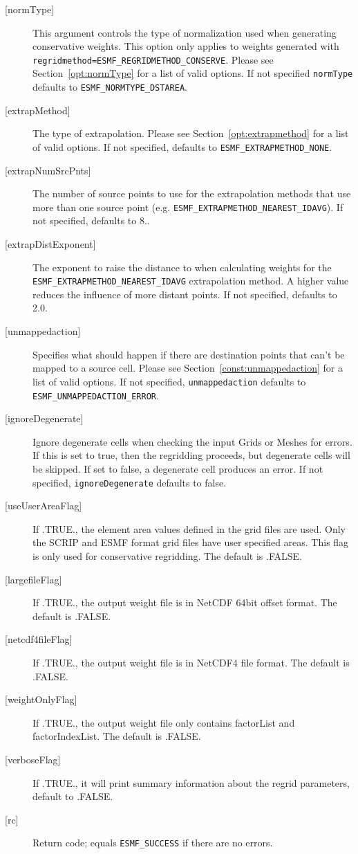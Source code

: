 \begin{description}
       \item [{[normType]}]
             This argument controls the type of normalization used when generating conservative weights. This option
             only applies to weights generated with {\tt regridmethod=ESMF\_REGRIDMETHOD\_CONSERVE}. Please see
             Section~\ref{opt:normType} for a
             list of valid options. If not specified {\tt normType} defaults to {\tt ESMF\_NORMTYPE\_DSTAREA}.
       \item [{[extrapMethod]}]
             The type of extrapolation. Please see Section~\ref{opt:extrapmethod}
             for a list of valid options. If not specified, defaults to
             {\tt ESMF\_EXTRAPMETHOD\_NONE}.
       \item [{[extrapNumSrcPnts]}]
             The number of source points to use for the extrapolation methods that use more than one source point
             (e.g. {\tt ESMF\_EXTRAPMETHOD\_NEAREST\_IDAVG}). If not specified, defaults to 8..
       \item [{[extrapDistExponent]}]
             The exponent to raise the distance to when calculating weights for
             the {\tt ESMF\_EXTRAPMETHOD\_NEAREST\_IDAVG} extrapolation method. A higher value reduces the influence
             of more distant points. If not specified, defaults to 2.0.
       \item [{[unmappedaction]}]
             Specifies what should happen if there are destination points that
             can't be mapped to a source cell. Please see Section~\ref{const:unmappedaction} for a
             list of valid options. If not specified, {\tt unmappedaction} defaults to {\tt ESMF\_UNMAPPEDACTION\_ERROR}.
       \item [{[ignoreDegenerate]}]
             Ignore degenerate cells when checking the input Grids or Meshes for errors. If this is set to true, then the
             regridding proceeds, but degenerate cells will be skipped. If set to false, a degenerate cell produces an error.
             If not specified, {\tt ignoreDegenerate} defaults to false.
     \item [{[useUserAreaFlag]}]
       If .TRUE., the element area values defined in the grid files are used.
       Only the SCRIP and ESMF format grid files have user specified areas. This flag
       is only used for conservative regridding. The default is .FALSE.
     \item [{[largefileFlag]}]
       If .TRUE., the output weight file is in NetCDF 64bit offset format.
       The default is .FALSE.
     \item [{[netcdf4fileFlag]}]
       If .TRUE., the output weight file is in NetCDF4 file format.
       The default is .FALSE.
     \item [{[weightOnlyFlag]}]
       If .TRUE., the output weight file only contains factorList and factorIndexList.
       The default is .FALSE.
     \item [{[verboseFlag]}]
       If .TRUE., it will print summary information about the regrid parameters,
       default to .FALSE.
     \item [{[rc]}]
       Return code; equals {\tt ESMF\_SUCCESS} if there are no errors.
     \end{description}
\setlength{\parskip}{\oldparskip}
\setlength{\parindent}{\oldparindent}
\setlength{\baselineskip}{\oldbaselineskip}
